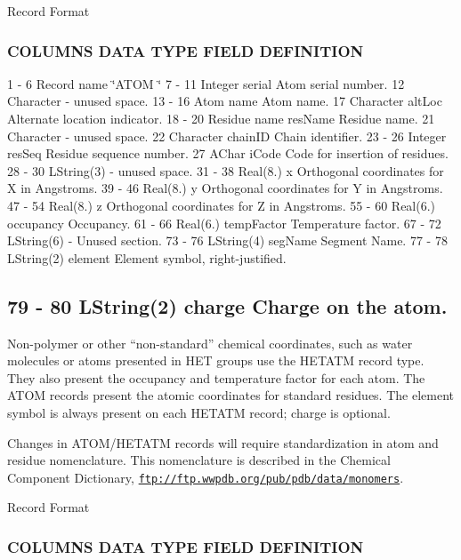 Record Format

\subsubsection*{C\+O\+L\+U\+M\+NS D\+A\+TA T\+Y\+PE F\+I\+E\+LD D\+E\+F\+I\+N\+I\+T\+I\+ON }

1 -\/ 6 Record name \char`\"{}\+A\+T\+O\+M  \char`\"{} 7 -\/ 11 Integer serial Atom serial number. 12 Character -\/ unused space. 13 -\/ 16 Atom name Atom name. 17 Character alt\+Loc Alternate location indicator. 18 -\/ 20 Residue name res\+Name Residue name. 21 Character -\/ unused space. 22 Character chain\+ID Chain identifier. 23 -\/ 26 Integer res\+Seq Residue sequence number. 27 A\+Char i\+Code Code for insertion of residues. 28 -\/ 30 L\+String(3) -\/ unused space. 31 -\/ 38 Real(8.) x Orthogonal coordinates for X in Angstroms. 39 -\/ 46 Real(8.) y Orthogonal coordinates for Y in Angstroms. 47 -\/ 54 Real(8.) z Orthogonal coordinates for Z in Angstroms. 55 -\/ 60 Real(6.) occupancy Occupancy. 61 -\/ 66 Real(6.) temp\+Factor Temperature factor. 67 -\/ 72 L\+String(6) -\/ Unused section. 73 -\/ 76 L\+String(4) seg\+Name Segment Name. 77 -\/ 78 L\+String(2) element Element symbol, right-\/justified. \subsection*{79 -\/ 80 L\+String(2) charge Charge on the atom. }

Non-\/polymer or other “non-\/standard” chemical coordinates, such as water molecules or atoms presented in H\+ET groups use the H\+E\+T\+A\+TM record type. They also present the occupancy and temperature factor for each atom. The A\+T\+OM records present the atomic coordinates for standard residues. The element symbol is always present on each H\+E\+T\+A\+TM record; charge is optional.

Changes in A\+T\+O\+M/\+H\+E\+T\+A\+TM records will require standardization in atom and residue nomenclature. This nomenclature is described in the Chemical Component Dictionary, \href{ftp://ftp.wwpdb.org/pub/pdb/data/monomers}{\tt ftp\+://ftp.\+wwpdb.\+org/pub/pdb/data/monomers}.

Record Format

\subsubsection*{C\+O\+L\+U\+M\+NS D\+A\+TA T\+Y\+PE F\+I\+E\+LD D\+E\+F\+I\+N\+I\+T\+I\+ON }

